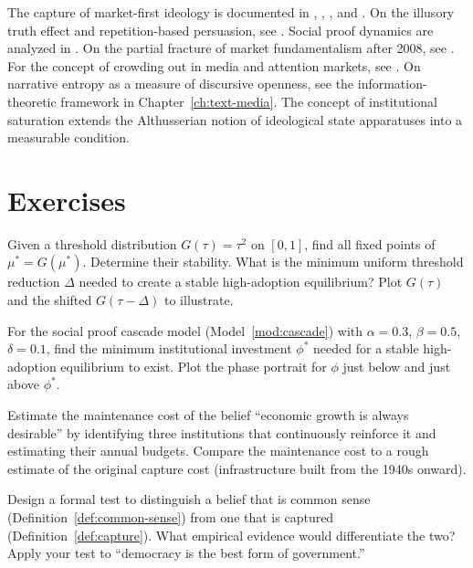 The capture of market-first ideology is documented in \textcite{mirowski2009}, \textcite{harvey2005}, \textcite{slobodian2018}, and \textcite{phillipsfein2009}.
On the illusory truth effect and repetition-based persuasion, see \textcite{kahneman2011}.
Social proof dynamics are analyzed in \textcite{cialdini2006}.
On the partial fracture of market fundamentalism after 2008, see \textcite{streeck2016}.
For the concept of crowding out in media and attention markets, see \textcite{mcchesney1999}.
On narrative entropy as a measure of discursive openness, see the information-theoretic framework in Chapter~\ref{ch:text-media}.
The concept of institutional saturation extends the Althusserian notion of ideological state apparatuses \autocite{althusser1970} into a measurable condition.


\section{Exercises}

\begin{exercise}
Given a threshold distribution $G(\tau) = \tau^2$ on $[0,1]$, find all fixed points of $\mu^* = G(\mu^*)$.
Determine their stability.
What is the minimum uniform threshold reduction $\Delta$ needed to create a stable high-adoption equilibrium?
Plot $G(\tau)$ and the shifted $G(\tau - \Delta)$ to illustrate.
\end{exercise}

\begin{exercise}
For the social proof cascade model (Model~\ref{mod:cascade}) with $\alpha = 0.3$, $\beta = 0.5$, $\delta = 0.1$, find the minimum institutional investment $\phi^*$ needed for a stable high-adoption equilibrium to exist.
Plot the phase portrait for $\phi$ just below and just above $\phi^*$.
\end{exercise}

\begin{exercise}
Estimate the maintenance cost of the belief ``economic growth is always desirable'' by identifying three institutions that continuously reinforce it and estimating their annual budgets.
Compare the maintenance cost to a rough estimate of the original capture cost (infrastructure built from the 1940s onward).
\end{exercise}

\begin{exercise}
Design a formal test to distinguish a belief that is common sense (Definition~\ref{def:common-sense}) from one that is captured (Definition~\ref{def:capture}).
What empirical evidence would differentiate the two?
Apply your test to ``democracy is the best form of government.''
\end{exercise}

